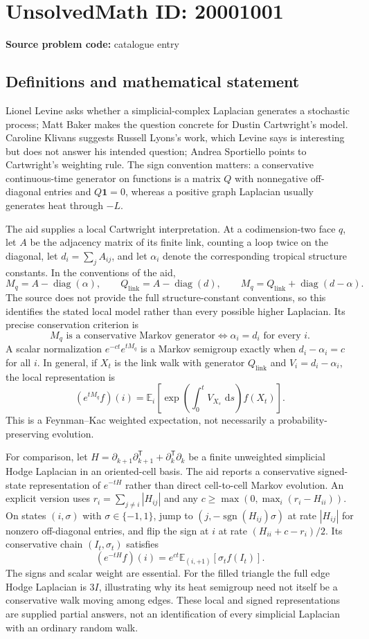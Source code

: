 \documentclass[11pt]{article}
\newcommand{\E}{\mathbb{E}}
\newcommand{\dd}{\,\mathrm{d}}
\begin{document}
\section*{UnsolvedMath ID: 20001001}
\textbf{Source problem code:} catalogue entry
\subsection{Definitions and mathematical statement}
Lionel Levine asks whether a simplicial-complex Laplacian generates a stochastic process; Matt Baker makes the question concrete for Dustin Cartwright's model. Caroline Klivans suggests Russell Lyons's work, which Levine says is interesting but does not answer his intended question; Andrea Sportiello points to Cartwright's weighting rule. The sign convention matters: a conservative continuous-time generator on functions is a matrix $Q$ with nonnegative off-diagonal entries and $Q\mathbf1=0$, whereas a positive graph Laplacian usually generates heat through $-L$.

The aid supplies a local Cartwright interpretation. At a codimension-two face $q$, let $A$ be the adjacency matrix of its finite link, counting a loop twice on the diagonal, let $d_i=\sum_jA_{ij}$, and let $\alpha_i$ denote the corresponding tropical structure constants. In the conventions of the aid,
\[
 M_q=A-\operatorname{diag}(\alpha),\qquad
 Q_{\mathrm{link}}=A-\operatorname{diag}(d),\qquad
 M_q=Q_{\mathrm{link}}+\operatorname{diag}(d-\alpha).
\]
The source does not provide the full structure-constant conventions, so this identifies the stated local model rather than every possible higher Laplacian. Its precise conservation criterion is
\[
 M_q\text{ is a conservative Markov generator}\iff \alpha_i=d_i\text{ for every }i.
\]
A scalar normalization $e^{-ct}e^{tM_q}$ is a Markov semigroup exactly when $d_i-\alpha_i=c$ for all $i$. In general, if $X_t$ is the link walk with generator $Q_{\mathrm{link}}$ and $V_i=d_i-\alpha_i$, the local representation is
\[
 (e^{tM_q}f)(i)=\E_i\!\left[\exp\!\left(\int_0^tV_{X_s}\,\dd s\right)f(X_t)\right].
\]
This is a Feynman--Kac weighted expectation, not necessarily a probability-preserving evolution.

For comparison, let $H=\partial_{k+1}\partial_{k+1}^{\mathsf T}+\partial_k^{\mathsf T}\partial_k$ be a finite unweighted simplicial Hodge Laplacian in an oriented-cell basis. The aid reports a conservative signed-state representation of $e^{-tH}$ rather than direct cell-to-cell Markov evolution. An explicit version uses $r_i=\sum_{j\ne i}|H_{ij}|$ and any $c\geq\max(0,\max_i(r_i-H_{ii}))$. On states $(i,\sigma)$ with $\sigma\in\{-1,1\}$, jump to $(j,-\operatorname{sgn}(H_{ij})\sigma)$ at rate $|H_{ij}|$ for nonzero off-diagonal entries, and flip the sign at $i$ at rate $(H_{ii}+c-r_i)/2$. Its conservative chain $(I_t,\sigma_t)$ satisfies
\[
 (e^{-tH}f)(i)=e^{ct}\E_{(i,+1)}[\sigma_t f(I_t)].
\]
The signs and scalar weight are essential. For the filled triangle the full edge Hodge Laplacian is $3I$, illustrating why its heat semigroup need not itself be a conservative walk moving among edges. These local and signed representations are supplied partial answers, not an identification of every simplicial Laplacian with an ordinary random walk.
\end{document}
